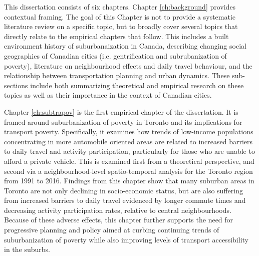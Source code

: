 This dissertation consists of six chapters. Chapter \ref{ch:background} provides contextual framing. The goal of this Chapter is not to provide a systematic literature review on a specific topic, but to broadly cover several topics that directly relate to the empirical chapters that follow. This includes a built environment history of suburbanaization in Canada, describing changing social geographies of Canadian cities (i.e. gentrification and subrubanization of poverty), literature on neighbourhood effects and daily travel behaviour, and the relationship between transportation planning and urban dynamics. These sub-sections include both summarizing theoretical and empirical research on these topics as well as their importance in the context of Canadian cities.

Chapter \ref{ch:subtrapov} is the first empirical chapter of the dissertation. It is framed around suburbanization of poverty in Toronto and its implications for transport poverty. Specifically, it examines how trends of low-income populations concentrating in more automobile oriented areas are related to increased barriers to daily travel and activity participation, particularly for those who are unable to afford a private vehicle. This is examined first from a theoretical perspective, and second via a neighbourhood-level spatio-temporal analysis for the Toronto region from 1991 to 2016. Findings from this chapter show that many suburban areas in Toronto are not only declining in socio-economic status, but are also suffering from increased barriers to daily travel evidenced by longer commute times and decreasing activity participation rates, relative to central neighbourhoods. Because of these adverse effects, this chapter further supports the need for progressive planning and policy aimed at curbing continuing trends of suburbanization of poverty while also improving levels of transport accessibility in the suburbs.

